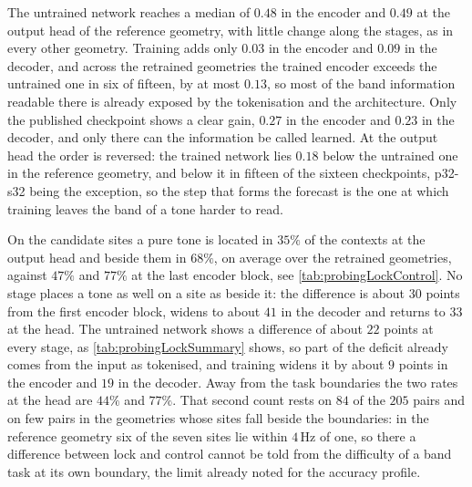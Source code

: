 {The untrained network reaches a median of $0.48$ in the encoder and $0.49$ at the output head of the reference geometry, with little change along the stages, as in every other geometry. Training adds only $0.03$ in the encoder and $0.09$ in the decoder, and across the retrained geometries the trained encoder exceeds the untrained one in six of fifteen, by at most $0.13$, so most of the band information readable there is already exposed by the tokenisation and the architecture. Only the published checkpoint shows a clear gain, $0.27$ in the encoder and $0.23$ in the decoder, and only there can the information be called learned. At the output head the order is reversed: the trained network lies $0.18$ below the untrained one in the reference geometry, and below it in fifteen of the sixteen checkpoints, p32-s32 being the exception, so the step that forms the forecast is the one at which training leaves the band of a tone harder to read.

On the candidate sites a pure tone is located in $35\%$ of the contexts at the output head and beside them in $68\%$, on average over the retrained geometries, against $47\%$ and $77\%$ at the last encoder block, see \autoref{tab:probingLockControl}. No stage places a tone as well on a site as beside it: the difference is about $30$ points from the first encoder block, widens to about $41$ in the decoder and returns to $33$ at the head. The untrained network shows a difference of about $22$ points at every stage, as \autoref{tab:probingLockSummary} shows, so part of the deficit already comes from the input as tokenised, and training widens it by about $9$ points in the encoder and $19$ in the decoder. Away from the task boundaries the two rates at the head are $44\%$ and $77\%$. That second count rests on $84$ of the $205$ pairs and on few pairs in the geometries whose sites fall beside the boundaries: in the reference geometry six of the seven sites lie within $4$\,Hz of one, so there a difference between lock and control cannot be told from the difficulty of a band task at its own boundary, the limit already noted for the accuracy profile.

}

